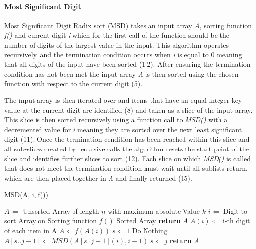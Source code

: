 \documentclass[12pt]{article}
\begin{document}
	\paragraph{Most Significant Digit} \label{sssec:msdradix}
	Most Significant Digit Radix sort (MSD) takes an input array \textit{A}, sorting function \textit{f()} and current digit \textit{i} which for the first call of the function should be the number of digits of the largest value in the input. This algorithm operates recursively, and the termination condition occurs when \textit{i} is equal to 0 meaning that all digits of the input have been sorted (1,2). After ensuring the termination condition has not been met the input array \textit{A} is then sorted using the chosen function with respect to the current digit (5). 
	\par 
	The input array is then iterated over and items that have an equal integer key value at the current digit are identified (8) and taken as a slice of the input array. This slice is then sorted recursively using a function call to \textit{MSD()} with a decremented value for \textit{i} meaning they are sorted over the next least significant digit (11). Once the termination condition has been reached within this slice and all sub-slices created by recursive calls the algorithm resets the start point of the slice and identifies further slices to sort (12). Each slice on which \textit{MSD()} is called that does not meet the termination condition must wait until all sublists return, which are then placed together in \textit{A} and finally returned (15).
	\begin{algorithm} %
		\caption{MSD({A, i, f()})} %
		\label{alg4} %
		\begin{algorithmic}[1] %
			\REQUIRE $A \Leftarrow$ Unsorted Array of length $n$ with maximum absolute Value $k$
			\REQUIRE $i \Leftarrow$ Digit to sort Array on 
			\REQUIRE Sorting function $f()$
			\ENSURE Sorted Array
				\STATE \textbf{return} $A$
			\ENDIF
			\STATE $A(i) \Leftarrow$ i-th digit of each item in A
			\STATE $A \Leftarrow f(A(i))$ 
			\STATE $s \Leftarrow 1$ 
					\STATE Do Nothing
				\ELSE
					\STATE $A[s..j-1] \Leftarrow MSD(A[s..j-1](i), i-1)$
					\STATE $s \Leftarrow j$ 
				\ENDIF
			\ENDFOR
			\STATE \textbf{return} $A$
		\end{algorithmic}
	\end{algorithm}
	\pagebreak
\end{document}
